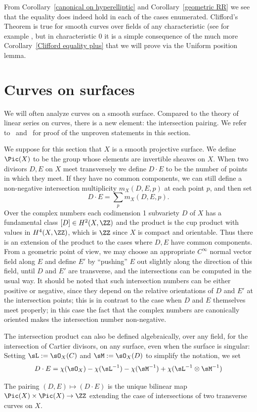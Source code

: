 From Corollary~\ref{canonical on hyperelliptic} and Corollary~\ref{geometric RR} we see that the equality does indeed hold
in each of the cases enumerated. Clifford's Theorem is true for smooth curves over fields of any characteristic (see for example \cite[IV.5.4]{Hartshorne1977}, but in characteristic 0 it is a simple consequence of the much more 
Corollary~\ref{Clifford equality plus}
that we will prove via the Uniform position lemma.


 \section{Curves on surfaces}
 We will often analyze curves  on a smooth surface. Compared to the theory of linear series on curves, there is a new element: the intersection pairing. We refer to~\cite[Chapter V]{Hartshorne1977}
 and~\cite[Chapter I]{Beauville} for proof of the unproven statements in this section.
 
 We suppose for this section that $X$ is a smooth projective surface.
 We define $\Pic(X)$ to be the group whose elements are invertible sheaves on $X$.
When two divisors $D,E$ on $X$ meet transversely we define $D\cdot E$ to be the number of points in which they meet. If they have no common
components, we can still define a non-negative intersection multiplicity $m_X(D,E,p)$ at each point $p$, and then set
$$
D\cdot E = \sum_p m_X(D,E,p).
$$
Over the complex numbers each codimension 1 subvariety $D$ of $X$ has a fundamental class
$[D]\in H^2(X, \ZZ)$ and the product is the cup product with values in $H^4(X,\ZZ)$, which is $\ZZ$ since $X$ is compact and orientable. Thus
there is an extension of the product to the cases where $D,E$ have common components. From a geometric point of view, we may choose an
appropriate $C^\infty$
normal vector field along $E$ and define $E'$ by ``pushing'' $E$ out slightly along the direction of this field, until $D$ and $E'$ are transverse,
and the intersections can be computed in the usual way. It should be noted that such intersection numbers can be either positive or negative,
since they depend on the relative orientations of $D$ and $E'$ at the intersection points; this is in contrast to the case when $D$ and $E$
themselves meet properly; in this case the fact that the complex numbers are canonically oriented makes the intersection number non-negative.

The intersection product can also be defined algebraically, over any field, for the intersection of Cartier divisors,
on any surface, even when the surface is singular: Setting $\sL := \sO_X(C)$ and
$\sM := \sO_X(D)$ to simplify the notation, we set 
$$
D\cdot E = \chi(\sO_X)-\chi(\sL^{-1}) -\chi(\sM^{-1}) +\chi(\sL^{-1}\otimes \sM^{-1}) 
$$
\begin{theorem} The pairing $(D,E) \mapsto (D\cdot E)$ is the unique bilinear map
$\Pic(X) \times \Pic(X) \to \ZZ$ extending the case of intersections of two transverse curves on $X$. 
\end{theorem}

